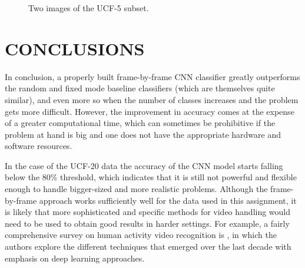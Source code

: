 \documentclass[letterpaper, 10 pt, conference]{IEEEtran}
\begin{document}
\begin{figure}[h!]
    \centering
    \caption{Two images of the UCF-5 subset.}
    \label{fig:example}
\end{figure}

\section{CONCLUSIONS}

In conclusion, a properly built frame-by-frame CNN classifier greatly outperforms the random and fixed mode baseline classifiers (which are themselves quite similar), and even more so when the number of classes increases and the problem gets more difficult. However, the improvement in accuracy comes at the expense of a greater computational time, which can sometimes be prohibitive if the problem at hand is big and one does not have the appropriate hardware and software resources.

In the case of the UCF-20 data the accuracy of the CNN model starts falling below the 80\% threshold, which indicates that it is still not powerful and flexible enough to handle bigger-sized and more realistic problems. Although the frame-by-frame approach works sufficiently well for the data used in this assignment, it is likely that more sophisticated and specific methods for video handling would need to be used to obtain good results in harder settings. For example, a fairly comprehensive survey on human activity video recognition is \cite{survey}, in which the authors explore the different techniques that emerged over the last decade with emphasis on deep learning approaches.
\end{document}
